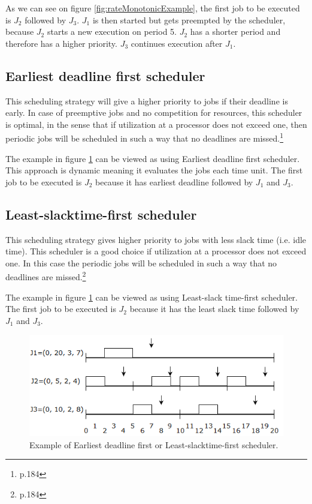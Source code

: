 As we can see on figure \ref{fig:rateMonotonicExample}, the first job to be executed is $J_2$ followed by $J_3$. $J_1$ is then started but gets preempted by the scheduler, because $J_2$ starts a new execution on period 5. $J_2$ has a shorter period and therefore has a higher priority. $J_3$ continues execution after $J_1$.

\subsection{Earliest deadline first scheduler}
This scheduling strategy will give a higher priority to jobs if their deadline is
early. In case of preemptive jobs and no competition for resources, this scheduler
is optimal, in the sense that if utilization at a processor does not exceed one, then
periodic jobs will be scheduled in such a way that no deadlines are missed.\footnote{\cite{Fokkink1965} p.184}

The example in figure \ref{fig:EarliestDeadlineFirstAndLeastSlacktimeFirstSchedulerExample} can be viewed as using Earliest deadline first scheduler. This approach is dynamic meaning it evaluates the jobs each time unit. The first job to be executed is $J_2$ because it has earliest deadline followed by $J_1$ and $J_3$.

\subsection{Least-slacktime-first scheduler}
This scheduling strategy gives higher priority to jobs with less slack time (i.e. idle time). This scheduler is a good choice if utilization at a processor does not exceed one. In this case the periodic jobs will be scheduled in such a way that no deadlines are missed.\footnote{\cite{Fokkink1965} p.184}

The example in figure \ref{fig:EarliestDeadlineFirstAndLeastSlacktimeFirstSchedulerExample} can be viewed as using Least-slack time-first scheduler. The first job to be executed is $J_2$ because it has the least slack time followed by $J_1$ and $J_3$.

\begin{figure}[h!]\label{}
	\centering
	\includegraphics[scale=0.5]{realTimeComputing/fig/EarliestDeadlineFirst.png}
	\caption{Example of Earliest deadline first or Least-slacktime-first scheduler.}
	\label{fig:EarliestDeadlineFirstAndLeastSlacktimeFirstSchedulerExample}
\end{figure}

